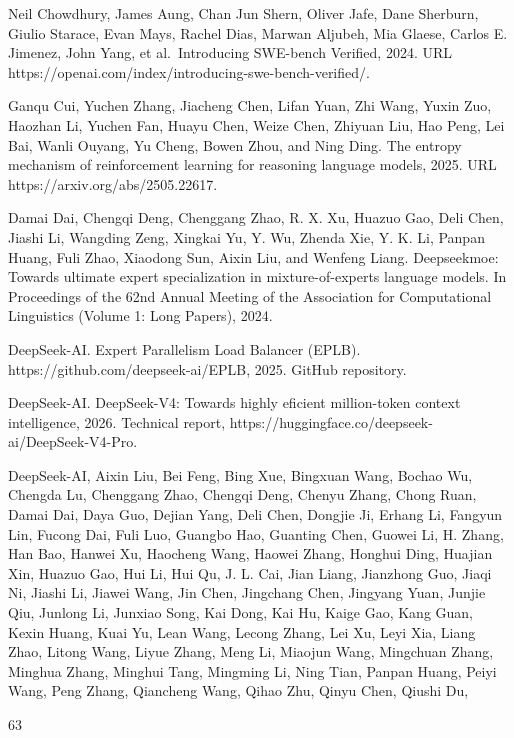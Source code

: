 \documentclass[
  10
]{article}
\begin{document}
Neil Chowdhury, James Aung, Chan Jun Shern, Oliver Jafe, Dane Sherburn,
Giulio Starace, Evan Mays, Rachel Dias, Marwan Aljubeh, Mia Glaese,
Carlos E. Jimenez, John Yang, et al.~Introducing SWE-bench Verified,
2024. URL https://openai.com/index/introducing-swe-bench-verified/.

Ganqu Cui, Yuchen Zhang, Jiacheng Chen, Lifan Yuan, Zhi Wang, Yuxin Zuo,
Haozhan Li, Yuchen Fan, Huayu Chen, Weize Chen, Zhiyuan Liu, Hao Peng,
Lei Bai, Wanli Ouyang, Yu Cheng, Bowen Zhou, and Ning Ding. The entropy
mechanism of reinforcement learning for reasoning language models, 2025.
URL https://arxiv.org/abs/2505.22617.

Damai Dai, Chengqi Deng, Chenggang Zhao, R. X. Xu, Huazuo Gao, Deli
Chen, Jiashi Li, Wangding Zeng, Xingkai Yu, Y. Wu, Zhenda Xie, Y. K. Li,
Panpan Huang, Fuli Zhao, Xiaodong Sun, Aixin Liu, and Wenfeng Liang.
Deepseekmoe: Towards ultimate expert specialization in
mixture-of-experts language models. In Proceedings of the 62nd Annual
Meeting of the Association for Computational Linguistics (Volume 1: Long
Papers), 2024.

DeepSeek-AI. Expert Parallelism Load Balancer (EPLB).
https://github.com/deepseek-ai/EPLB, 2025. GitHub repository.

DeepSeek-AI. DeepSeek-V4: Towards highly eficient million-token context
intelligence, 2026. Technical report,
https://huggingface.co/deepseek-ai/DeepSeek-V4-Pro.

DeepSeek-AI, Aixin Liu, Bei Feng, Bing Xue, Bingxuan Wang, Bochao Wu,
Chengda Lu, Chenggang Zhao, Chengqi Deng, Chenyu Zhang, Chong Ruan,
Damai Dai, Daya Guo, Dejian Yang, Deli Chen, Dongjie Ji, Erhang Li,
Fangyun Lin, Fucong Dai, Fuli Luo, Guangbo Hao, Guanting Chen, Guowei
Li, H. Zhang, Han Bao, Hanwei Xu, Haocheng Wang, Haowei Zhang, Honghui
Ding, Huajian Xin, Huazuo Gao, Hui Li, Hui Qu, J. L. Cai, Jian Liang,
Jianzhong Guo, Jiaqi Ni, Jiashi Li, Jiawei Wang, Jin Chen, Jingchang
Chen, Jingyang Yuan, Junjie Qiu, Junlong Li, Junxiao Song, Kai Dong, Kai
Hu, Kaige Gao, Kang Guan, Kexin Huang, Kuai Yu, Lean Wang, Lecong Zhang,
Lei Xu, Leyi Xia, Liang Zhao, Litong Wang, Liyue Zhang, Meng Li, Miaojun
Wang, Mingchuan Zhang, Minghua Zhang, Minghui Tang, Mingming Li, Ning
Tian, Panpan Huang, Peiyi Wang, Peng Zhang, Qiancheng Wang, Qihao Zhu,
Qinyu Chen, Qiushi Du,

63
\end{document}
